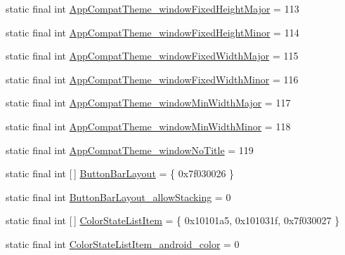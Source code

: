 \begin{DoxyCompactItemize}
\item 
static final int \mbox{\hyperlink{classandroid_1_1support_1_1v7_1_1appcompat_1_1_r_1_1styleable_a1f4a316a2ac90d0a80b719552a6f3726}{App\+Compat\+Theme\+\_\+window\+Fixed\+Height\+Major}} = 113
\item 
static final int \mbox{\hyperlink{classandroid_1_1support_1_1v7_1_1appcompat_1_1_r_1_1styleable_a3c341d6d5f75db307f85528b4cd2dffb}{App\+Compat\+Theme\+\_\+window\+Fixed\+Height\+Minor}} = 114
\item 
static final int \mbox{\hyperlink{classandroid_1_1support_1_1v7_1_1appcompat_1_1_r_1_1styleable_a985db90234eb62763be3a1d458eb7d90}{App\+Compat\+Theme\+\_\+window\+Fixed\+Width\+Major}} = 115
\item 
static final int \mbox{\hyperlink{classandroid_1_1support_1_1v7_1_1appcompat_1_1_r_1_1styleable_ab05126bfb1793565c042a93809b9b8aa}{App\+Compat\+Theme\+\_\+window\+Fixed\+Width\+Minor}} = 116
\item 
static final int \mbox{\hyperlink{classandroid_1_1support_1_1v7_1_1appcompat_1_1_r_1_1styleable_ab5e88d04afeab7ebae0a257a0422a70e}{App\+Compat\+Theme\+\_\+window\+Min\+Width\+Major}} = 117
\item 
static final int \mbox{\hyperlink{classandroid_1_1support_1_1v7_1_1appcompat_1_1_r_1_1styleable_afe3027147df3f5fe89a3b87527006755}{App\+Compat\+Theme\+\_\+window\+Min\+Width\+Minor}} = 118
\item 
static final int \mbox{\hyperlink{classandroid_1_1support_1_1v7_1_1appcompat_1_1_r_1_1styleable_ae4efadb126436382233b75342a8c001d}{App\+Compat\+Theme\+\_\+window\+No\+Title}} = 119
\item 
static final int \mbox{[}$\,$\mbox{]} \mbox{\hyperlink{classandroid_1_1support_1_1v7_1_1appcompat_1_1_r_1_1styleable_a7c65a92be88c9f9803f46314aaabe499}{Button\+Bar\+Layout}} = \{ 0x7f030026 \}
\item 
static final int \mbox{\hyperlink{classandroid_1_1support_1_1v7_1_1appcompat_1_1_r_1_1styleable_adf94e2a1bbfcc7e82913885952418e1a}{Button\+Bar\+Layout\+\_\+allow\+Stacking}} = 0
\item 
static final int \mbox{[}$\,$\mbox{]} \mbox{\hyperlink{classandroid_1_1support_1_1v7_1_1appcompat_1_1_r_1_1styleable_ab1a10b8aa8b05ad84ba6100d75826b13}{Color\+State\+List\+Item}} = \{ 0x10101a5, 0x101031f, 0x7f030027 \}
\item 
static final int \mbox{\hyperlink{classandroid_1_1support_1_1v7_1_1appcompat_1_1_r_1_1styleable_a486c4fc28cfc21512b89a08c027a81b5}{Color\+State\+List\+Item\+\_\+android\+\_\+color}} = 0

\end{DoxyCompactItemize}
